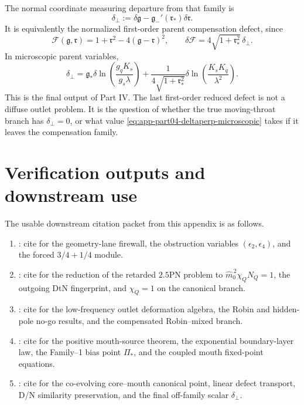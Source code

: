 The normal coordinate measuring departure from that family is
\begin{equation}
\label{eq:app-part04-deltaperp-def}
\delta_\perp
:=
\delta\mathfrak g
-
\mathfrak g_-'(\mathfrak r_*)\delta\mathfrak r.
\end{equation}
It is equivalently the normalized first-order parent compensation defect, since
\begin{equation}
\label{eq:app-part04-deltaF-deltaperp}
\mathcal F(\mathfrak g,\mathfrak r)=1+\mathfrak r^2-4(\mathfrak g-\mathfrak r)^2,
\qquad
\delta\mathcal F=4\sqrt{1+\mathfrak r_*^2}\,\delta_\perp.
\end{equation}
In microscopic parent variables,
\begin{equation}
\label{eq:app-part04-deltaperp-microscopic}
\boxed{
\delta_\perp
=
\mathfrak g_*
\delta\ln\left(\frac{g_qK_s}{g_s\lambda}\right)
+
\frac{1}{4\sqrt{1+\mathfrak r_*^2}}
\delta\ln\left(\frac{K_sK_q}{\lambda^2}\right)}.
\end{equation}
This is the final output of Part IV.  The last first-order reduced defect is not a diffuse outlet problem.  It is the question of whether the true moving-throat branch has \(\delta_\perp=0\), or what value \eqref{eq:app-part04-deltaperp-microscopic} takes if it leaves the compensation family.

\section{Verification outputs and downstream use}
\label{sec:app-part04-verification-outputs}

The usable downstream citation packet from this appendix is as follows.
\begin{enumerate}[leftmargin=2.2em]
\item {}: cite for the geometry-lane firewall, the obstruction variables \((\epsilon_2,\epsilon_4)\), and the forced \(3/4+1/4\) module.
\item {}: cite for the reduction of the retarded \(2.5\)PN problem to \(\widehat m_0^{\,2}\chi_QN_Q=1\), the outgoing DtN fingerprint, and \(\chi_Q=1\) on the canonical branch.
\item {}: cite for the low-frequency outlet deformation algebra, the Robin and hidden-pole no-go results, and the compensated Robin--mixed branch.
\item {}: cite for the positive mouth-source theorem, the exponential boundary-layer law, the Family--1 bias point \(\Pi_*\), and the coupled mouth fixed-point equations.
\item {}: cite for the co-evolving core--mouth canonical point, linear defect transport, D/N similarity preservation, and the final off-family scalar \(\delta_\perp\).
\end{enumerate}


